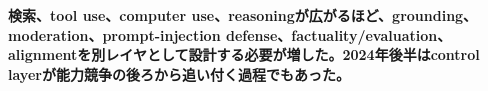 \noindent\textbf{検索、tool use、computer use、reasoningが広がるほど、grounding、moderation、prompt-injection defense、factuality/evaluation、alignmentを別レイヤとして設計する必要が増した。2024年後半はcontrol layerが能力競争の後ろから追い付く過程でもあった。}\autocite{src-308d34e54e69,src-33d811167435}
